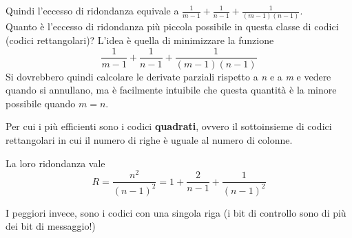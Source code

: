 Quindi l'eccesso di ridondanza equivale a $\frac{1}{m-1} + \frac{1}{n-1} + \frac{1}{(m-1)(n-1)}$.\\
Quanto è l'eccesso di ridondanza più piccola possibile in questa classe di codici (codici rettangolari)?
L'idea è quella di minimizzare la funzione
\begin{equation*}
\frac{1}{m-1} + \frac{1}{n-1} + \frac{1}{(m-1)(n-1)}
\end{equation*}
Si dovrebbero quindi calcolare le derivate parziali rispetto a \textit{n} e a \textit{m} e vedere quando si annullano, ma è facilmente intuibile che questa quantità è la minore possibile quando $m=n$.

Per cui i più efficienti sono i codici \textbf{quadrati}, ovvero il sottoinsieme di codici rettangolari in cui il numero di righe è uguale al numero di colonne.

La loro ridondanza vale
\begin{equation*}
R = \frac{n^2}{(n-1)^2} = 1 + \frac{2}{n-1} + \frac{1}{(n-1)^2}
\end{equation*}

I peggiori invece, sono i codici con una singola riga (i bit di controllo sono di più dei bit di messaggio!)













